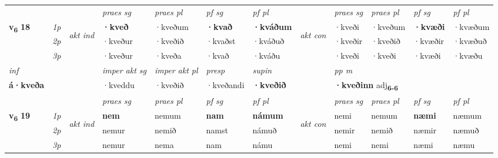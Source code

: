 \begin{longtable}[l]{X>{\footnotesize\itshape}llXXXXlXXXX}
\midrule

 & &   & \textit{praes sg}  & \textit{praes pl}    & \textit{ pf sg} & \textit{pf pl} & & \textit{praes sg}  & \textit{praes pl}    & \textit{pf sg} & \textit{pf pl }  \\ \cmidrule{4-7} \cmidrule{9-12}
 \multirow{2}{*}{{{\textbf{v{\textsubscript{6}}} \Large{\textbf{18}}}}}  & 1p & \multirow{3}{*}{\begin{turn}{90}\textit{akt ind}\end{turn}} & \textbf{·kveð} & ·kveðum & \textbf{·kvað} & \textbf{·kváðum} & \multirow{3}{*}{\begin{turn}{90}\textit{akt con}\end{turn}} &·kveði & ·kveðum & \textbf{·kvæði} & ·kvæðum\\*
 & 2p &  &  ·kveður  & ·kveðið & ·kvaðst & ·kváðuð & & ·kveðir & ·kveðið & ·kvæðir & ·kvæðuð \\*
 & 3p &  & ·kveður & ·kveða & ·kvað & ·kváðu & & ·kveði & ·kveði& ·kvæði & ·kvæðu \\*
\cmidrule{4-7} \cmidrule{9-12}

   {\textit{inf}} & &  & \textit{imper akt sg} & \textit{imper akt pl}   & \textit{presp} & \textit{supin}  && \textit{pp m} \\*
  {\textbf{á\allowbreak ·kveða}} & && ·kveddu  & ·kveðið   & ·kveðandi &  \textbf{·kveðið}  && \multicolumn{2}{l}{\textbf{·kveðinn} adj\textbf{\textsubscript{6-6}}} \\*

\midrule

 & &   & \textit{praes sg}  & \textit{praes pl}    & \textit{ pf sg} & \textit{pf pl} & & \textit{praes sg}  & \textit{praes pl}    & \textit{pf sg} & \textit{pf pl }  \\ \cmidrule{4-7} \cmidrule{9-12}
 \multirow{2}{*}{{{\textbf{v{\textsubscript{6}}} \Large{\textbf{19}}}}}  & 1p & \multirow{3}{*}{\begin{turn}{90}\textit{akt ind}\end{turn}} & \textbf{nem} & nemum & \textbf{nam} & \textbf{námum} & \multirow{3}{*}{\begin{turn}{90}\textit{akt con}\end{turn}} &nemi & nemum & \textbf{næmi} & næmum\\*
 & 2p &  &  nemur  & nemið & namst & námuð & & nemir & nemið & næmir & næmuð \\*
 & 3p &  & nemur & nema & nam & námu & & nemi & nemi& næmi & næmu \\*
\cmidrule{4-7} \cmidrule{9-12}


\end{longtable}

